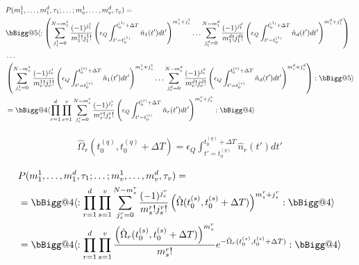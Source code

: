 \documentclass[12pt]{article}
\makeatletter
\newcommand{\ep}{\epsilon}
\newcommand{\vast}{\bBigg@{4}}
\newcommand{\Vast}{\bBigg@{5}}
\makeatother
\begin{document}
\begin{align}
&P(m_1^1,\ldots,m_1^d,\tau_1; \ldots ; m_v^1, \ldots, m_v^d, \tau_v) =\\
&\Vast\langle : 
\left(\sum_{j_1^1=0}^{N-m_1^1}\frac{(-1)^{j_1^1}}{m_1^1!j_1^1!} \left(\ep_Q\int_{t'=t_0^{(1)}}^{t_0^{(1)}+\Delta T}  \hat{n}_1(t') dt'\right)^{m_1^1+j_1^1}
\ldots
\sum_{j_1^d=0}^{N-m_1^d}\frac{(-1)^{j_1^d}}{m_1^d!j_1^d!} \left(\ep_Q\int_{t'=t_0^{(1)}}^{t_0^{(1)}+\Delta T}  \hat{n}_d(t') dt'\right)^{m_1^d+j_1^d}\right)\\
&\ldots\\
&\left(\sum_{j_v^1=0}^{N-m_v^1}\frac{(-1)^{j_v^1}}{m_v^1!j_v^1!} \left(\ep_Q\int_{t'=t_0^{(v)}}^{t_0^{(v)}+\Delta T}  \hat{n}_1(t') dt'\right)^{m_v^1+j_v^1}
\ldots
\sum_{j_v^d=0}^{N-m_v^d}\frac{(-1)^{j_v^d}}{m_v^d!j_v^d!} \left(\ep_Q\int_{t'=t_0^{(v)}}^{t_0^{(v)}+\Delta T}  \hat{n}_d(t') dt'\right)^{m_v^d+j_v^d}\right):\Vast \rangle\\
&= \vast \langle \prod_{r=1}^d \prod_{s=1}^v \sum_{j_s^r=0}^{N-m_s^r}\frac{(-1)^{j_s^r}}{m_s^r!j_s^r!} \left(\ep_Q\int_{t'=t_0^{(s)}}^{t_0^{(s)}+\Delta T} \hat{n}_r(t')dt'\right)^{m_s^r+j_s^r} :\vast\rangle
\end{align}

\begin{align}
\hat{\Omega}_r(t_0^{(q)},t_0^{(q)}+\Delta T) = \ep_Q\int_{t'=t_0^{(q)}}^{t_0^{(q)}+\Delta T}\hat{n}_r(t')dt'
\end{align}

\begin{align}
&P(m_1^1,\ldots,m_1^d,\tau_1; \ldots ; m_v^1, \ldots, m_v^d, \tau_v) =\\
&= \vast \langle : \prod_{r=1}^d \prod_{s=1}^v \sum_{j_s^r=0}^{N-m_s^r}\frac{(-1)^{j_s^r}}{m_s^r!j_s^r!} \left(\hat{\Omega}(t_0^{(s)},t_0^{(s)}+\Delta T)\right)^{m_s^r+j_s^r} :\vast\rangle\\
&= \vast \langle: \prod_{r=1}^d \prod_{s=1}^v \frac{\left(\hat{\Omega}_r(t_0^{(s)},t_0^{(s)}+\Delta T)\right)^{m_s^r}}{m_s^r!} e^{-\hat{\Omega}_r(t_0^{(s)},t_0^{(s)}+\Delta T)} :\vast \rangle
\end{align}
		
\end{document}
